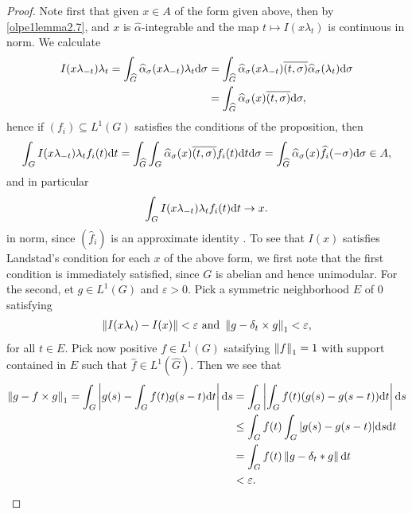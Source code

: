 \begin{proof}
	Note first that given $x \in A$ of the form given above, then by \cref{olpe1lemma2.7}, and $x$ is $\hat \alpha$-integrable and the map $t \mapsto I(x \lambda_t)$ is continuous in norm. We calculate
	\begin{align}
		I(x\lambda_{-t}) \lambda_t = \int_{\widehat{G}} \widehat{\alpha}_\sigma(x \lambda_{-t}) \lambda_t \mathrm{d} \sigma &= \int_{\widehat{G}} \widehat{\alpha}_\sigma(x \lambda_{-t}) \overline{(t,\sigma)} \widehat{\alpha}_\sigma(\lambda_t) \mathrm{d} \sigma\\
		&= \int_{\widehat{G}} \widehat{\alpha}_\sigma(x) \overline{(t,\sigma)} \mathrm{d} \sigma,
		\label{eq:olpe1lemma2.8}
	\end{align}
	hence if $(f_i) \subseteq L^1(G)$ satisfies the conditions of the proposition, then
	\begin{align*}
		\int_{G}I(x \lambda_{-t}) \lambda_t f_i(t) \mathrm{d} t = \int_{\widehat{G}} \int_G \widehat{\alpha}_\sigma(x) \overline{(t,\sigma)} f_i(t) \mathrm{d} t \mathrm{d} \sigma = \int_{\widehat{G}} \widehat{\alpha}_\sigma (x) \widehat{f}_i(-\sigma) \mathrm{d} \sigma \in A,
	\end{align*}
	and in particular
	\begin{align*}
		\int_G I(x \lambda_{-t}) \lambda_t f_i(t) \mathrm{d} t \to x.
	\end{align*}
	in norm, since $(\hat f_i)$ is an approximate identity . To see that $I\left( x \right)$ satisfies Landstad's condition for each $x$ of the above form, we first note that the first condition is immediately satisfied, since $G$ is abelian and hence unimodular. For the second, et $g \in L^1(G)$ and $\varepsilon > 0$. Pick a symmetric neighborhood $E$ of $0$ satisfying
	\begin{align*}
		\left\lVert I(x \lambda_t) - I(x) \right\rVert<\varepsilon \text{ and } \left\lVert g - \delta_t \times g \right\rVert_1 < \varepsilon,
	\end{align*}
	for all $t \in E$. Pick now positive $f \in L^1(G)$ satsifying $\left\lVert f \right\rVert_1 = 1$ with support contained in $E$ such that $\hat f \in L^1 (\hat G)$. Then we see that
	\begin{align*}
		\left\lVert g - f \times g \right\rVert_1 = \int_G \left|g(s) - \int_G f(t) g(s-t) \mathrm{d} t\right| \mathrm{d} s &= \int_G \left | \int_G f(t)(g(s)-g(s-t)) \mathrm{d} t \right| \mathrm{d} s \\
		&\leq \int_G f(t) \int_G | g(s) - g(s-t)| \mathrm{d} s \mathrm{d} t\\
		& = \int_G f(t) \left\lVert g - \delta_t \ast g \right\rVert \mathrm{d} t \\
		&< \varepsilon.
	\end{align*}

\end{proof}
